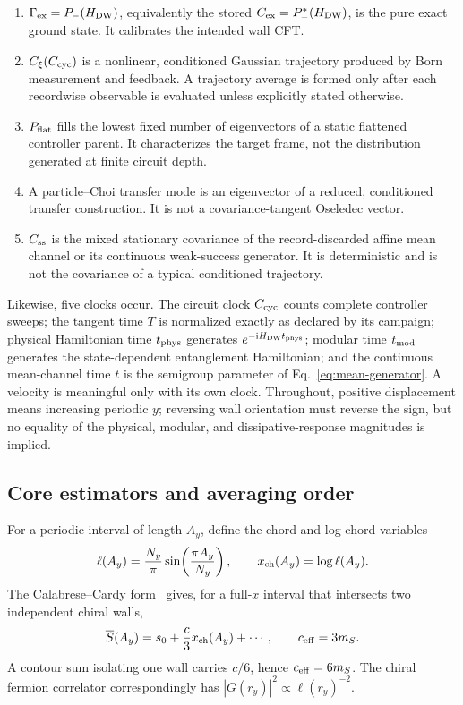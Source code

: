 \documentclass[aps,prb,twocolumn,floatfix,nofootinbib,superscriptaddress]{revtex4-2}
\newcommand{\ii}{\mathrm{i}}
\begin{document}
\begin{enumerate}
\item $\Gamma_{\rm ex}=P_-(H_{\rm DW})$, equivalently the stored
      $C_{\rm ex}=P_-^*(H_{\rm DW})$, is the pure exact ground state.  It calibrates
      the intended wall CFT.
\item $C_\xi(C_{\rm cyc})$ is a nonlinear, conditioned Gaussian trajectory produced by
      Born measurement and feedback.  A trajectory average is formed only after each
      recordwise observable is evaluated unless explicitly stated otherwise.
\item $P_{\rm flat}$ fills the lowest fixed number of eigenvectors of a static
      flattened controller parent.  It characterizes the target frame, not the
      distribution generated at finite circuit depth.
\item A particle--Choi transfer mode is an eigenvector of a reduced, conditioned transfer
      construction.  It is not a covariance-tangent Oseledec vector.
\item $C_{\rm ss}$ is the mixed stationary covariance of the record-discarded affine mean
      channel or its continuous weak-success generator.  It is deterministic and is not
      the covariance of a typical conditioned trajectory.
\end{enumerate}

Likewise, five clocks occur.  The circuit clock $C_{\rm cyc}$ counts complete controller
sweeps; the tangent time $T$ is normalized exactly as declared by its campaign; physical
Hamiltonian time $t_{\rm phys}$ generates $e^{-\ii H_{\rm DW}t_{\rm phys}}$; modular time
$t_{\rm mod}$ generates the state-dependent entanglement Hamiltonian; and the continuous
mean-channel time $t$ is the semigroup parameter of Eq.~\eqref{eq:mean-generator}.  A
velocity is meaningful only with its own clock.  Throughout, positive displacement means
increasing periodic $y$; reversing wall orientation must reverse the sign, but no equality
of the physical, modular, and dissipative-response magnitudes is implied.

\subsection{Core estimators and averaging order}
\label{sec:estimator-dictionary}

For a periodic interval of length $A_y$, define the chord and log-chord variables
\begin{equation}
 \ell(A_y)=\frac{N_y}{\pi}\sin\!\left(\frac{\pi A_y}{N_y}\right),
 \qquad x_{\rm ch}(A_y)=\log\ell(A_y).
 \label{eq:chord-coordinate}
\end{equation}
The Calabrese--Cardy form~\cite{CalabreseCardy2004} gives, for a full-$x$ interval that
intersects two independent chiral walls,
\begin{equation}
 \overline S(A_y)=s_0+\frac{c}{3}x_{\rm ch}(A_y)+\cdots,
 \qquad c_{\rm eff}=3m_S .
 \label{eq:entropy-target}
\end{equation}
A contour sum isolating one wall carries $c/6$, hence $c_{\rm eff}=6m_S$.  The chiral
fermion correlator correspondingly has $|G(r_y)|^2\propto\ell(r_y)^{-2}$.
\end{document}
